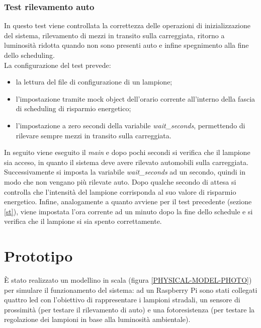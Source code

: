 \subsubsection{Test rilevamento auto}
In questo test viene controllata la correttezza delle operazioni di inizializzazione del sistema, rilevamento di mezzi in transito sulla carreggiata, ritorno a luminosità ridotta quando non sono presenti auto e infine spegnimento alla fine dello scheduling.
\\La configurazione del test prevede:
\begin{itemize}
	\item la lettura del file di configurazione di un lampione;
	\item l'impostazione tramite mock object dell'orario corrente all'interno della fascia di scheduling di risparmio energetico;
	\item l'impostazione a zero secondi della variabile \textit{wait\_seconds}, permettendo di rilevare sempre mezzi in transito sulla carreggiata.
\end{itemize}
In seguito viene eseguito il \textit{main} e dopo pochi secondi si verifica che il lampione sia acceso, in quanto il sistema deve avere rilevato automobili sulla carreggiata.
Successivamente si imposta la variabile \textit{wait\_seconds} ad un secondo, quindi in modo che non vengano più rilevate auto.
Dopo qualche secondo di attesa si controlla che l'intensità del lampione corrisponda al suo valore di risparmio energetico.
Infine, analogamente a quanto avviene per il test precedente (sezione \ref{st}), viene impostata l'ora corrente ad un minuto dopo la fine dello schedule e si verifica che il lampione si sia spento correttamente.


\section{Prototipo}
È stato realizzato un modellino in scala (figura \ref{PHYSICAL-MODEL-PHOTO}) per simulare il funzionamento del sistema: ad un Raspberry Pi sono stati collegati quattro led con l'obiettivo di rappresentare i lampioni stradali, un sensore di prossimità (per testare il rilevamento di auto) e una fotoresistenza (per testare la regolazione dei lampioni in base alla luminosità ambientale).
